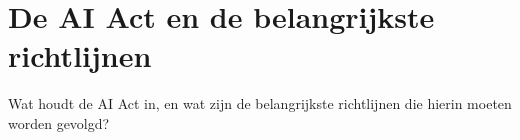 \section{De AI Act en de belangrijkste richtlijnen}
Wat houdt de AI Act in, en wat zijn de belangrijkste richtlijnen die hierin moeten worden gevolgd?
